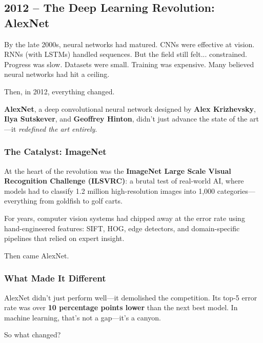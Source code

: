 \subsection{2012 – The Deep Learning Revolution: AlexNet}

By the late 2000s, neural networks had matured.  
CNNs were effective at vision.  
RNNs (with LSTMs) handled sequences.  
But the field still felt... constrained.  
Progress was slow. Datasets were small. Training was expensive.  
Many believed neural networks had hit a ceiling.

Then, in 2012, everything changed.

\textbf{AlexNet}, a deep convolutional neural network designed by \textbf{Alex Krizhevsky}, \textbf{Ilya Sutskever}, and \textbf{Geoffrey Hinton}, didn’t just advance the state of the art—it \emph{redefined the art entirely}.

\subsubsection{The Catalyst: ImageNet}

At the heart of the revolution was the \textbf{ImageNet Large Scale Visual Recognition Challenge (ILSVRC)}: a brutal test of real-world AI, where models had to classify 1.2 million high-resolution images into 1,000 categories—everything from goldfish to golf carts.

For years, computer vision systems had chipped away at the error rate using hand-engineered features: SIFT, HOG, edge detectors, and domain-specific pipelines that relied on expert insight.

Then came AlexNet.

\subsubsection{What Made It Different}

AlexNet didn’t just perform well—it demolished the competition.  
Its top-5 error rate was over \textbf{10 percentage points lower} than the next best model. In machine learning, that’s not a gap—it’s a canyon.

So what changed?

